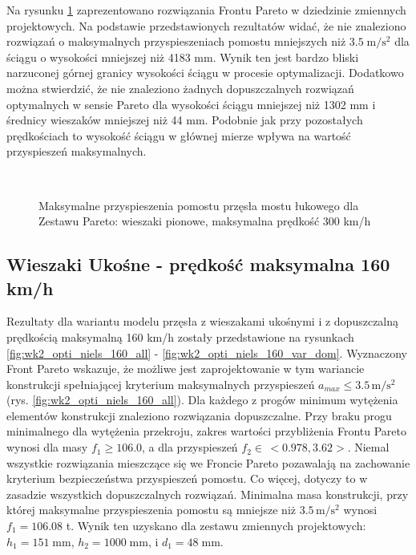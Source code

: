 Na rysunku \ref{fig:wk2_opti_proste_300_var_dom} zaprezentowano rozwiązania Frontu Pareto w dziedzinie zmiennych projektowych. Na podstawie przedstawionych rezultatów widać, że nie znaleziono rozwiązań o maksymalnych przyspieszeniach pomostu mniejszych niż $3.5\;\mathrm{m/s^2}$ dla ściągu o wysokości mniejszej niż 4183 mm. Wynik ten jest bardzo bliski narzuconej górnej granicy wysokości ściągu w procesie optymalizacji. Dodatkowo można stwierdzić, że nie znaleziono żadnych dopuszczalnych rozwiązań optymalnych w sensie Pareto dla wysokości ściągu mniejszej niż 1302 mm i średnicy wieszaków mniejszej niż 44 mm. Podobnie jak przy pozostałych prędkościach to wysokość ściągu w głównej mierze wpływa na wartość przyspieszeń maksymalnych.

\begin{figure}[hbt!]
	\centering
	\\
	\captionsetup{justification=centering}
	\caption{Maksymalne przyspieszenia pomostu przęsła mostu łukowego dla Zestawu Pareto: wieszaki pionowe, maksymalna prędkość 300 km/h}
	\label{fig:wk2_opti_proste_300_var_dom}
\end{figure}





\pagebreak[4]
\subsection{Wieszaki Ukośne - prędkość maksymalna 160 km/h}

Rezultaty dla wariantu modelu przęsła z wieszakami ukośnymi i z dopuszczalną prędkością maksymalną 160 km/h zostały przedstawione na rysunkach \ref{fig:wk2_opti_niels_160_all} - \ref{fig:wk2_opti_niels_160_var_dom}. Wyznaczony Front Pareto wskazuje, że możliwe jest zaprojektowanie w tym wariancie konstrukcji spełniającej kryterium maksymalnych przyspieszeń $a_{max}\le 3.5\,\mathrm{m/s^2}$ (rys. \ref{fig:wk2_opti_niels_160_all}). Dla każdego z progów minimum wytężenia elementów konstrukcji znaleziono rozwiązania dopuszczalne. Przy braku progu minimalnego dla wytężenia przekroju, zakres wartości przybliżenia Frontu Pareto wynosi dla masy $f_1 \ge 106.0$, a dla przyspieszeń $f_2 \in\,<0.978,3.62>$. Niemal wszystkie rozwiązania mieszczące się we Froncie Pareto pozawalają na zachowanie kryterium bezpieczeństwa przyspieszeń pomostu. Co więcej, dotyczy to w zasadzie wszystkich dopuszczalnych rozwiązań. Minimalna masa konstrukcji, przy której maksymalne przyspieszenia pomostu są mniejsze niż $3.5\,\mathrm{m/s^2}$ wynosi $f_1 = 106.08$ t. Wynik ten uzyskano dla zestawu zmiennych projektowych: $h_1 = 151\;\mathrm{mm}$, $h_2 = 1000\;\mathrm{mm}$, i $d_1 = 48\;\mathrm{mm}$.

